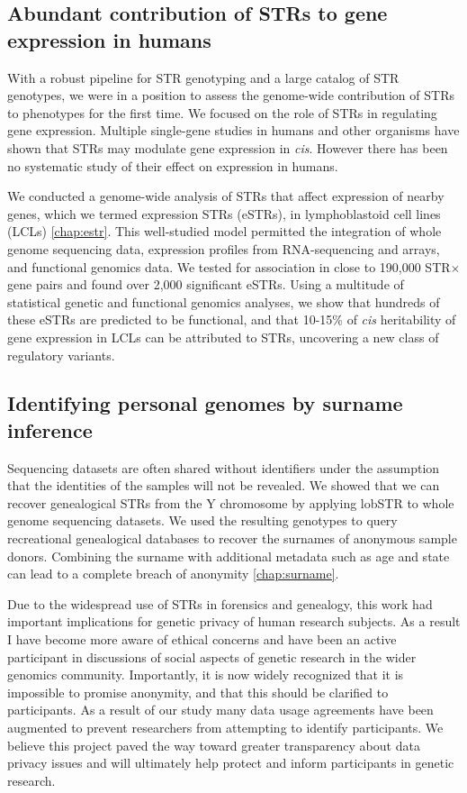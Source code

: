 \subsection{Abundant contribution of STRs to gene expression in humans}
With a robust pipeline for STR genotyping and a large catalog of STR genotypes, we were in a position to assess the genome-wide contribution of STRs to phenotypes for the first time. We focused on the role of STRs in regulating gene expression. Multiple single-gene studies in humans and other organisms have shown that STRs may modulate gene expression in \emph{cis}. However there has been no systematic study of their effect on expression in humans.

We conducted a genome-wide analysis of STRs that affect expression of nearby genes, which we termed expression STRs (eSTRs), in lymphoblastoid cell lines (LCLs) \cite{GymrekWillemsGuilmatreEtAl2015} \autoref{chap:estr}. This well-studied model permitted the integration of whole genome sequencing data, expression profiles from RNA-sequencing and arrays, and functional genomics data. We tested for association in close to 190,000 STR$\times$gene pairs and found over 2,000 significant eSTRs. Using a multitude of statistical genetic and functional genomics analyses, we show that hundreds of these eSTRs are predicted to be functional, and that 10-15\% of \emph{cis} heritability of gene expression in LCLs can be attributed to STRs, uncovering a new class of regulatory variants.

\subsection{Identifying personal genomes by surname inference}
Sequencing datasets are often shared without identifiers under the assumption that the identities of the samples will not be revealed. We showed that we can recover genealogical STRs from the Y chromosome by applying lobSTR to whole genome sequencing datasets. We used the resulting genotypes to query recreational genealogical databases to recover the surnames of anonymous sample donors. Combining the surname with additional metadata such as age and state can lead to a complete breach of anonymity \cite{GymrekMcGuireGolanEtAl2013} \autoref{chap:surname}.

Due to the widespread use of STRs in forensics and genealogy, this work had important implications for genetic privacy of human research subjects. As a result I have become more aware of ethical concerns and have been an active participant in discussions of social aspects of genetic research in the wider genomics community. Importantly, it is now widely recognized that it is impossible to promise anonymity, and that this should be clarified to participants. As a result of our study many data usage agreements have been augmented to prevent researchers from attempting to identify participants. We believe this project paved the way toward greater transparency about data privacy issues and will ultimately help protect and inform participants in genetic research.

